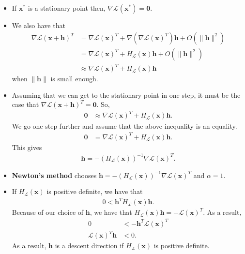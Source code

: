 \documentclass[10pt]{article}
\newcommand{\ve}[1]{\mathbf{#1}}
\newcommand{\mcal}[1]{\mathcal{#1}}
\begin{document}
\begin{itemize}
    \item If $\ve{x}^*$ is a stationary point then, $\nabla \mcal{L}(\ve{x}^*) = \ve{0}$.
    
    \item We also have that
    \begin{align*}
        \nabla \mcal{L}(\ve{x} + \ve{h})^T
        &= \nabla \mcal{L}(\ve{x})^T + \nabla(\nabla \mcal{L}(\ve{x})^T) \ve{h} + O(\| \ve{h} \|^2) \\
        &= \nabla \mcal{L}(\ve{x})^T + H_{\mcal{L}}(\ve{x}) \ve{h} + O(\| \ve{h} \|^2) \\
        &\approx \nabla \mcal{L}(\ve{x})^T + H_{\mcal{L}}(\ve{x}) \ve{h}
    \end{align*}
    when $\| \ve{h} \|$ is small enough.

    \item Assuming that we can get to the stationary point in one step, it must be the case that $\nabla \mcal{L}(\ve{x} + \ve{h})^T = \ve{0}$. So,
    \begin{align*}
        \ve{0} &\approx \nabla \mcal{L}(\ve{x})^T + H_{\mcal{L}}(\ve{x}) \ve{h}.
    \end{align*}
    We go one step further and assume that the above inequality is an equality.
    \begin{align*}
        \ve{0} &= \nabla\mcal{L}(\ve{x})^T + H_{\mcal{L}}(\ve{x}) \ve{h}.
    \end{align*}
    This gives
    \begin{align*}
        \ve{h} = - (H_{\mcal{L}}(\ve{x}))^{-1} \nabla\mcal{L}(\ve{x})^T.
    \end{align*}

    \item {\bf Newton's method} chooses $\ve{h} = - (H_{\mcal{L}}(\ve{x}))^{-1} \nabla\mcal{L}(\ve{x})^T$ and $\alpha = 1$.
    
    \item If $H_{\mcal{L}}(\ve{x})$ is positive definite, we have that
    \begin{align*}
        0 < \ve{h}^T H_{\mcal{L}}(\ve{x}) \ve{h}.
    \end{align*}
    Because of our choice of $\ve{h}$, we have that $H_{\mcal{L}}(\ve{x}) \ve{h} = -\mcal{L}(\ve{x})^T$. As a result,
    \begin{align*}
        0 &< - \ve{h}^T \mcal{L}(\ve{x})^T \\
        \mcal{L}(\ve{x})^T \ve{h} &< 0.
    \end{align*}
    As a result, $\ve{h}$ is a descent direction if $H_{\mcal{L}}(\ve{x})$ is positive definite.


\end{itemize}
\end{document}
